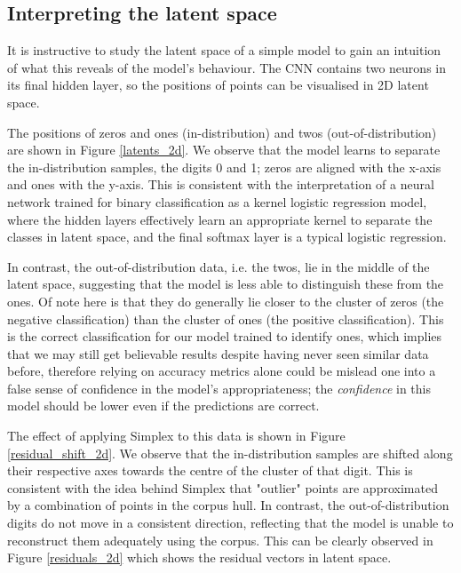 \documentclass{article}
\begin{document}
\subsection{Interpreting the latent space}
\label{sec:interpret latent space}

It is instructive to study the latent space of a simple model to gain an intuition of what this reveals of the model's behaviour. The CNN contains two neurons in its final hidden layer, so the positions of points can be visualised in 2D latent space.

The positions of zeros and ones (in-distribution) and twos (out-of-distribution) are shown in Figure \ref{latents_2d}. We observe that the model learns to separate the in-distribution samples, the digits 0 and 1; zeros are aligned with the x-axis and ones with the y-axis. This is consistent with the interpretation of a  neural network trained for binary classification as a kernel logistic regression model, where the hidden layers effectively learn an appropriate kernel to separate the classes in latent space, and the final softmax layer is a typical logistic regression.

In contrast, the out-of-distribution data, i.e. the twos, lie in the middle of the latent space, suggesting that the model is less able to distinguish these from the ones. Of note here is that they do generally lie closer to the cluster of zeros (the negative classification) than the cluster of ones (the positive classification). This is the correct classification for our model trained to identify ones, which implies that we may still get believable results despite having never seen similar data before, therefore relying on accuracy metrics alone could be mislead one into a false sense of confidence in the model's appropriateness; the \emph{confidence} in this model should be lower even if the predictions are correct.

The effect of applying Simplex to this data is shown in Figure \ref{residual_shift_2d}. We observe that the in-distribution samples are shifted along their respective axes towards the centre of the cluster of that digit. This is consistent with the idea behind Simplex that "outlier" points are approximated by a combination of points in the corpus hull. In contrast, the out-of-distribution digits do not move in a consistent direction, reflecting that the model is unable to reconstruct them adequately using the corpus. This can be clearly observed in Figure \ref{residuals_2d} which shows the residual vectors in latent space.
\end{document}
